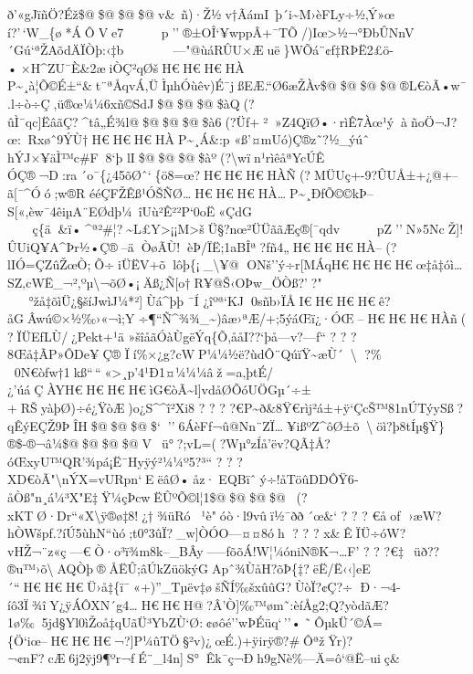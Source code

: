 ð'«gJïñÖ?Éž\$@\$@\$@\$@v\&~ñ)·Ž½v†ÃámI~þ´i\textasciitilde M›èFLy÷½‚Ý»­œ
í?'\,`W\_\{ø*ÁÔVe7  
p''®±OÎ`¥wppÂ+¯TÕ/)Iœ\textgreater½¬°ÐbÛNnV´Gú`ªŽAõdÄÏÒþ:‹‡b   
---"@ùáRÛU×Æuë\}WÕá¨¢ƒ‡RÞ\textbar Ë2£ö-•×H\^{}ZU¯È\&2æiÒÇ²qØšH€H€H€HÀ
P\textasciitilde¸à¦Õ©É±``\&t¨ªÅqvÁ‚ÜÌµhÓ\textbar ùêv)É¯jßEÆ.``Ø6æŽÀv\$@\$@\$@\$@®L€òÃ•w¯.l÷ò÷Ç,ü®œ¼¼6\textbar xñ©SdJ\$@\$@\$@\$àQ(?ûÌ¯qc{]}ËâãÇ?\^{}tâ„É¾l@\$@\$@\$@\$à6(?Üf+²»Z4QïØ•·rìÊ7Àœ¹ýàñoÖ¬J?œ:Rxøˆ9ÝÙ†H€H€H€HÀP\textasciitilde¸Á\&:p
«ß'¤mUó)Ç®z˜?½\_ýúˆ hÝJ×¥äÌ™c\#F8`þ
lI\$@\$@\$@\$àº(?\textbackslash wïn¹rìêåªYcÚÊ
ÓÇ®¬D:ra´o¯\{¿45õØˆ`\{ö8\textbar=œ?H€H€H€HÀÑ(?MÜUç+-9?ÛUÅ±+¿@+--ã{[}¯\^{}Óó;w®R
ééÇFŽÊß¹ÓŠÑØ\ldotsH€H€H€HÀ\ldotsP\textasciitilde¸ÐfÕ©©kÞ--S{[}«,èw¯4êiµA¨EØdþ¼~îUù²Ê²²P`0oË«ÇdG

ç\{ä\&ï•\^{}ª²\#¦?\textasciitilde L£Y\textgreater¡¡M\textgreater šÜ§?nœ²ÜÜããÆç®{[}¯qdv\textquotesingle

pZ''N»5NcŽ{]}!ÛUiQ¥A\^{}Þr½•Ç®--äÒøÃÙ!èÞ/ÏË;1aBÎª?fñ4„H€H€H€HÀ--(?lIÓ=ÇZûŽœÒ;Õ÷iÜËV+õlôþ\{¡\_\textbackslash¥@
ONš''ý÷r{[}MÁqH€H€H€H€œ‡ å‡óì\ldots SZ‚cWË\_¬²,ºµ\textbackslash¬õØ•¡Äß¿Ñ{[}o†R¥@Š‹OÞw\_ÖÒß?'?"
°ž å‡õìÜ¿§šíJwìJ¼*²{]}Ù\textbar á\^{}þþ ¯Í
¿îºª`KJ\textbar0sñb›ÏÅI€H€H€H€ê? åGÂwú©×½\textquotesingle‰›«¬ì;Y÷¶``Ñ\^{}¾¾\_\textasciitilde)âæ›ªÆ/+;5ýáŒï¿·ÓŒ--H€H€H€HÀñ(?ÏÜEfLÙ/¿Pekt+¹ä
»šîåãÓàÙgëÝq\{Õ,ååI??{}`þå---v?---ƒ``  ?  ?  ?  8Œ å‡ÃP»ÔDe¥Ç®
Ïí\%×¿g?cWP¼¼½ë?ùdÔ¨QúïŸ\textasciitilde æÙ´\textbackslash{} ?\%  
0N€òƒw†1kß``\,``«\textgreater¸p'4¹Ð1¤¼¼¼âž=a‚þtÉ/¿'úáÇÀYH€H€H€H€ìG€òÃ\textasciitilde l{]}vdåØÕóUÖGµ´÷±+RŠyàþØ)÷é¿ŸòÆ)o¿S\^{}\^{}î²Xi8
?  ?  ? 
?€P\textasciitilde ð\&8Ÿ€rìj²á±+ÿ`ÇcŠ™81nÚTýySß?qÊýEÇŽ9ÞÎH\$@\$@\$@\$`''6ÁèFƒ¬û@Nn¨ZÏ\ldots¥ißºZ\^{}ôØ±õ\textbackslashöì?þ8tÍµ§Ÿ\}®\$-­®¬â¼\$@\$@\$@\$@V~ü°?;vL=(?Wµ°zÍå'\textquotesingle ëv?QÃ‡Å?óŒxyU™QR'¾pá¡Ë¯Hyÿý²¼¼º5?³`` 
?  ?  ? 
XD€òÃ"\textbackslash nÝX=vURpn`EëâØ•åz·EQBïˆý÷!åTöûDDÔŸ6­åÒß"n¸á¼³X"E‡Ÿ¼çÞcwËÛºÕ©l¦1\$@\$@\$@\$@(?xKTØ·Dr``«X\textbackslash ÿ®ø‡8!¿†¾üRó¹è"óò·l9vû\textquotesingle ï½¯ðð\textquotesingle´œ\&` 
?  ?  ?  € åoƒ ›æW?hÒWšpf.?íÚ5ùhN``ùó;t0°3ûÏ?\_w{]}ÒÓO---¤¤8óh ?  ?  ? 
x\&ÊÏÜ÷óW?vHŽ¬¨z«ç---€Ò·o³ï¾m8k--\_BÂy-----f\textbar õõÁ!W¦¼óniN®K¬\ldots F' 
?  ? 
?€‡~üð??®u™›õ\textbackslashAQÒþ®ÅËÛ;âÚkZüökýGApˆ¾ÙåH?õÞ\{‡?ëË/Ë‹‹{]}eE´``H€H€H€Ü› å‡\{ï¯«+)''­\_Tµëv‡øšÑÍ‰šxûûG?ÙòÏ?¢Ç?÷
Ð·¬4-íô3Ï¾îY¿ÿÁÔXN´g4\ldotsH€H€H@?Â'Ò{]}‰™ø­m˜:èíÅg2;Q?yòdãÆ?1ø‰\textquotesingle5jd§Yl0ìŽoå‡qUãÜ³YbZÙ`Ø:¢øôé''wÞÉüq`\,''•˜ÔµkÜ´©Á=\{Ö`iœ--H€H€H€¬\textquotesingle?{]}P¼ûTÖ§²v\textquotesingle)¿œÉ.)+ÿirÿ®?\#­ÔªžŸr)?¬¢nF\textquotesingle?cÆ6j2ÿj9¶ºr¬fÉ¨\_l4n{]}S°Êk¯ç¬Ðh9gNè\%---Ä=ô`@Ë--uiç\&
